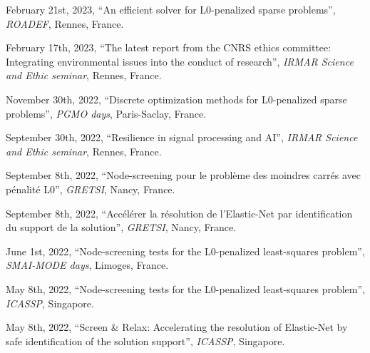 \begin{etaremune}
    \item February 21st, 2023, ``An efficient solver for L0-penalized sparse problems'', \textit{ROADEF}, Rennes, France.
    \item February 17th, 2023, ``The latest report from the CNRS ethics committee: Integrating environmental issues into the conduct of research'', \textit{IRMAR Science and Ethic seminar}, Rennes, France.
    \item November 30th, 2022, ``Discrete optimization methods for L0-penalized sparse problems'', \textit{PGMO days}, Paris-Saclay, France.
    \item September 30th, 2022, ``Resilience in signal processing and AI'', \textit{IRMAR Science and Ethic seminar}, Rennes, France.
    \item September 8th, 2022, ``Node-screening pour le problème des moindres carrés avec pénalité L0'', \textit{GRETSI}, Nancy, France.
    \item September 8th, 2022, ``Accélérer la résolution de l’Elastic-Net par identification du support de la solution'', \textit{GRETSI}, Nancy, France.
    \item June 1st, 2022, ``Node-screening tests for the L0-penalized least-squares problem'', \textit{SMAI-MODE days}, Limoges, France.
    \item May 8th, 2022, ``Node-screening tests for the L0-penalized least-squares problem'', \textit{ICASSP}, Singapore.
    \item May 8th, 2022, ``Screen \& Relax: Accelerating the resolution of Elastic-Net by safe identification of the solution support'', \textit{ICASSP}, Singapore.
\end{etaremune}